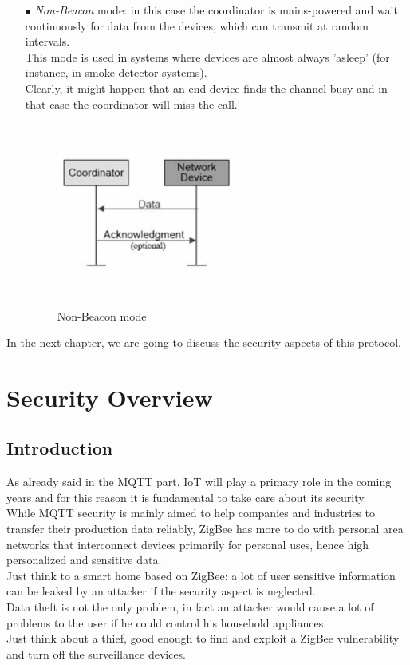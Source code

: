 \documentclass[12pt]{report}
\begin{document}
{{\begin{itemize}
\item[$\bullet$] \emph{Non-Beacon} mode: in this case the coordinator is mains-powered and wait continuously for data from the devices, which can transmit at random intervals.\\
This mode is used in systems where devices are almost always 'asleep' (for instance, in smoke detector systems).\\
Clearly, it might happen that an end device finds the channel busy and in that case the coordinator will miss the call.

\begin{figure}[H]
\includegraphics[width=6cm,height=6cm,keepaspectratio]{zigbee_nonbeaconmode}
\centering
\caption{Non-Beacon mode}
\end{figure}

\end{itemize}

In the next chapter, we are going to discuss the security aspects of this protocol.\\

\chapter{Security Overview}

\section{Introduction}
\bigskip
As already said in the MQTT part, IoT will play a primary role in the coming years and for this reason it is fundamental to take care about its security.\\
While MQTT security is mainly aimed to help companies and industries to transfer their production data reliably, ZigBee has more to do with personal area networks that interconnect devices primarily for personal uses, hence high personalized and sensitive data.\\
Just think to a smart home based on ZigBee: a lot of user sensitive information can be leaked by an attacker if the security aspect is neglected.\\
Data theft is not the only problem, in fact an attacker would cause a lot of problems to the user if he could control his household appliances.\\
Just think about a thief, good enough to find and exploit a ZigBee vulnerability and turn off the surveillance devices.\\\\

}}
\end{document}
